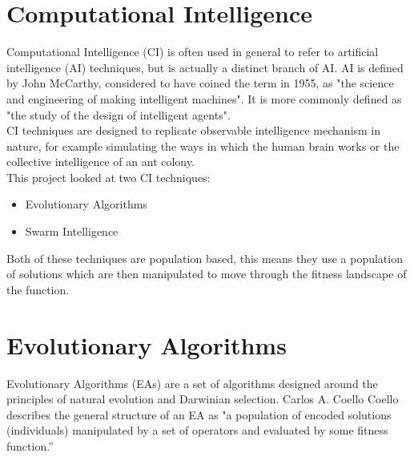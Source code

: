 \section{Computational Intelligence}
Computational Intelligence (CI) is often used in general to refer to artificial intelligence (AI) techniques, but is actually a distinct branch of AI. AI is defined by John McCarthy, considered to have coined the term in 1955, as "the science and engineering of making intelligent machines"\cite{mccarthy}. It is more commonly defined as "the study of the design of intelligent agents"\cite{poole}.
\\CI techniques are designed to replicate observable intelligence mechanism in nature, for example simulating the ways in which the human brain works or the collective intelligence of an ant colony. 
\\This project looked at two CI techniques:
\begin{itemize}
  \item{Evolutionary Algorithms}
  \item{Swarm Intelligence}
\end{itemize}
Both of these techniques are population based, this means they use a population of solutions which are then manipulated to move through the fitness landscape of the function.

\section{Evolutionary Algorithms}
\label{sec:ea}
Evolutionary Algorithms (EAs) are a set of algorithms designed around the principles of natural evolution and Darwinian selection. Carlos A. Coello Coello describes the general structure of an EA as "a population of encoded solutions (individuals) manipulated by a set of operators and evaluated by some fitness function.”\cite{coello}

